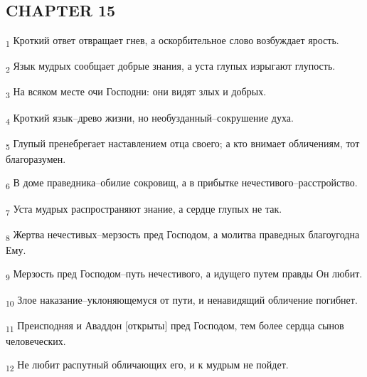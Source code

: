 \subsection{CHAPTER 15}
\begin{tcolorbox}
\textsubscript{1} Кроткий ответ отвращает гнев, а оскорбительное слово возбуждает ярость.
\end{tcolorbox}
\begin{tcolorbox}
\textsubscript{2} Язык мудрых сообщает добрые знания, а уста глупых изрыгают глупость.
\end{tcolorbox}
\begin{tcolorbox}
\textsubscript{3} На всяком месте очи Господни: они видят злых и добрых.
\end{tcolorbox}
\begin{tcolorbox}
\textsubscript{4} Кроткий язык--древо жизни, но необузданный--сокрушение духа.
\end{tcolorbox}
\begin{tcolorbox}
\textsubscript{5} Глупый пренебрегает наставлением отца своего; а кто внимает обличениям, тот благоразумен.
\end{tcolorbox}
\begin{tcolorbox}
\textsubscript{6} В доме праведника--обилие сокровищ, а в прибытке нечестивого--расстройство.
\end{tcolorbox}
\begin{tcolorbox}
\textsubscript{7} Уста мудрых распространяют знание, а сердце глупых не так.
\end{tcolorbox}
\begin{tcolorbox}
\textsubscript{8} Жертва нечестивых--мерзость пред Господом, а молитва праведных благоугодна Ему.
\end{tcolorbox}
\begin{tcolorbox}
\textsubscript{9} Мерзость пред Господом--путь нечестивого, а идущего путем правды Он любит.
\end{tcolorbox}
\begin{tcolorbox}
\textsubscript{10} Злое наказание--уклоняющемуся от пути, и ненавидящий обличение погибнет.
\end{tcolorbox}
\begin{tcolorbox}
\textsubscript{11} Преисподняя и Аваддон [открыты] пред Господом, тем более сердца сынов человеческих.
\end{tcolorbox}
\begin{tcolorbox}
\textsubscript{12} Не любит распутный обличающих его, и к мудрым не пойдет.
\end{tcolorbox}
